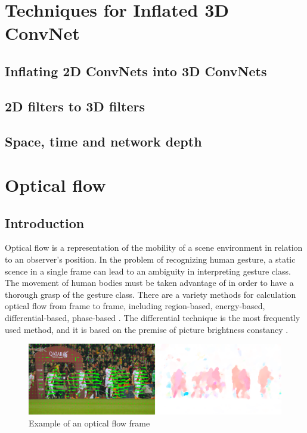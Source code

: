 \documentclass[a4paper, 12pt]{article}
\begin{document}
\section{Techniques for Inflated 3D ConvNet}
\subsection{Inflating 2D ConvNets into 3D ConvNets}
\subsection{2D filters to 3D filters}
\subsection{Space, time and network depth}

\section{Optical flow}
\subsection{Introduction}
Optical flow is a representation of the mobility of a scene environment in relation to an observer's position. In the problem of recognizing human gesture, a static scence in a single frame can lead to an ambiguity in interpreting gesture class.  The movement of human bodies must be taken advantage of in order to have a thorough grasp of the gesture class. There are a variety methods for calculation optical flow from frame to frame, including region-based, energy-based, differential-based, phase-based \citep{marco2018computer}. The differential technique is the most frequently used method, and it is based on the premise of picture brightness constancy \citep{horn1981determining}.

\begin{figure}[H]
    \centering
    \includegraphics[width=\textwidth]{Football-1024x288.png}
    \caption{Example of an optical flow frame \citep{opticalflowExample}}
    \label{Figure x}
\end{figure}
\end{document}
